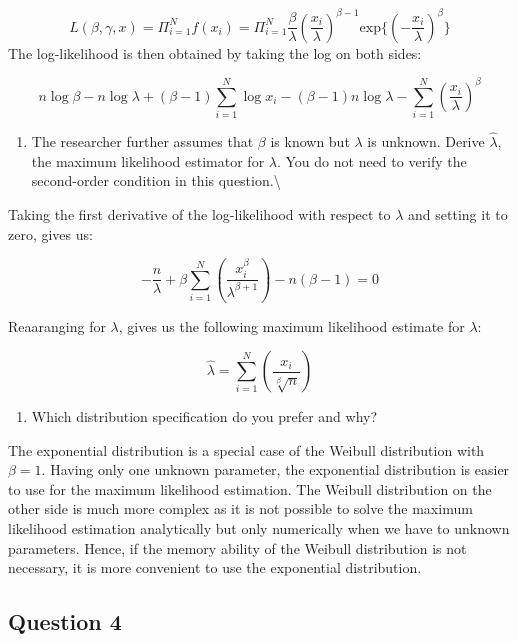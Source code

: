 \documentclass[
]{article}
\providecommand{\tightlist}{%
  \setlength{\itemsep}{0pt}\setlength{\parskip}{0pt}}
\begin{document}
\[
L(\beta, \gamma, x) = \Pi_{i=1}^N f(x_i) = \Pi_{i=1}^N \frac{\beta}{\lambda}\left(\frac{x_i}{\lambda}\right)^{\beta-1} \text{exp}\{\left(-\frac{x_i}{\lambda}\right)^\beta\} 
\] The log-likelihood is then obtained by taking the log on both sides:

\[
n \log \beta - n \log \lambda + (\beta-1) \sum_{i=1}^N \log x_i - (\beta-1) n \log \lambda - \sum_{i=1}^N \left(\frac{x_i}{\lambda}\right)^\beta 
\]

\begin{enumerate}
\def\labelenumi{\alph{enumi}.}
\setcounter{enumi}{3}
\tightlist
\item
  The researcher further assumes that \(\beta\) is known but \(\lambda\)
  is unknown. Derive \(\hat\lambda\), the maximum likelihood estimator
  for \(\lambda\). You do not need to verify the second-order condition
  in this question.\textbackslash{}
\end{enumerate}

Taking the first derivative of the log-likelihood with respect to
\(\lambda\) and setting it to zero, gives us:

\[
-\frac{n}{\lambda} + \beta \sum_{i=1}^N \left(\frac{x_i^\beta}{\lambda^{\beta + 1}}\right) - n(\beta-1) = 0
\]

Reaaranging for \(\lambda\), gives us the following maximum likelihood
estimate for \(\lambda\):

\[
\hat{\lambda} = \sum_{i=1}^N \left(\frac{x_i}{\sqrt[\beta]{n}}\right)
\]

\begin{enumerate}
\def\labelenumi{\alph{enumi}.}
\setcounter{enumi}{4}
\tightlist
\item
  Which distribution specification do you prefer and why?
\end{enumerate}

The exponential distribution is a special case of the Weibull
distribution with \(\beta = 1\). Having only one unknown parameter, the
exponential distribution is easier to use for the maximum likelihood
estimation. The Weibull distribution on the other side is much more
complex as it is not possible to solve the maximum likelihood estimation
analytically but only numerically when we have to unknown parameters.
Hence, if the memory ability of the Weibull distribution is not
necessary, it is more convenient to use the exponential distribution.

\hypertarget{question-4}{%
\subsection{Question 4}\label{question-4}}
\end{document}

